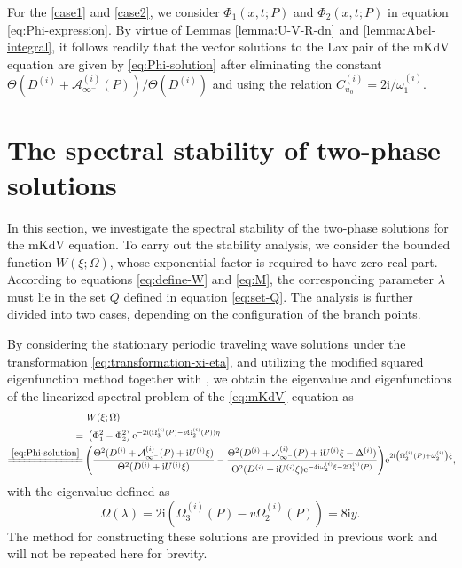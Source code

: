 \documentclass[11pt,reqno]{amsart}
\newcommand{\ii}{\mathrm{i}}
\newcommand{\ee}{\mathrm{e}}
\numberwithin{equation}{section}
\begin{document}
\newenvironment{proof-solution-dn-Phi}{\emph{\textbf{Proof of \Cref{theorem:solution-Phi}.}}}{\hfill$\Box$\medskip}
\begin{proof-solution-dn-Phi}
	For the \ref{case1} and \ref{case2}, we consider $\Phi_{1}(x,t;P)$ and $\Phi_{2}(x,t;P)$ in equation \eqref{eq:Phi-expression}. By virtue of Lemmas \ref{lemma:U-V-R-dn} and \ref{lemma:Abel-integral}, it follows readily that the vector solutions to the Lax pair of the mKdV equation are given by \eqref{eq:Phi-solution}
	after eliminating the constant $\Theta(D^{(i)}+\mathcal{A}^{(i)}_{\infty^-}(P))/\Theta(D^{(i)})$ and using the relation $C_{u_0}^{(i)}=2\ii/\omega_1^{(i)}$.
\end{proof-solution-dn-Phi}
 


\section{The spectral stability of two-phase solutions }\label{section:spectral-stability}

In this section, we investigate the spectral stability of the two-phase solutions for the mKdV equation.  
To carry out the stability analysis, we consider the bounded function $W(\xi;\Omega)$, whose exponential factor is required to have zero real part. 
According to equations \eqref{eq:define-W} and \eqref{eq:M}, the corresponding parameter $\lambda$ must lie in the set $Q$ defined in equation \eqref{eq:set-Q}.
The analysis is further divided into two cases, depending on the configuration of the branch points.

By considering the stationary periodic traveling wave solutions  under the transformation \eqref{eq:transformation-xi-eta},  and utilizing the modified squared eigenfunction method together with  , we obtain the eigenvalue and eigenfunctions of the linearized spectral problem of the \ref{eq:mKdV} equation as
\begin{equation}\label{eq:define-W}
	\begin{split}
	\!\!	&\ W(\xi;\Omega)\\
	=&\ \left(\Phi_{1}^2-\Phi_{2}^2\right)\ee^{-2\ii (\Omega_3^{(i)}(P)-v\Omega_2^{(i)}(P)) \eta}\\
	\xlongequal{\eqref{eq:Phi-solution}}& \left(\frac{\Theta^2(D^{(i)}+\mathcal{A}_{\infty^{-}}^{(i)}(P)+\ii U^{(i)}\xi)}{\Theta^2(D^{(i)}+\ii U^{(i)}\xi)}-\frac{\Theta^2(D^{(i)}+\mathcal{A}_{\infty^{-}}^{(i)}(P)+\ii U^{(i)}\xi -\Delta^{(i)})}
		{\Theta^2(D^{(i)}+\ii U^{(i)}\xi)\ee^{-4\ii \omega_{2}^{(i)}\xi-2\Omega_1^{(i)}(P)}}\right) \!
		\ee^{2\ii \left(\Omega_2^{(i)}(P) + \omega_2^{(i)} \right)\xi},\!\!
	\end{split}
\end{equation}
with the eigenvalue defined as 
\begin{equation}\label{eq:define-Omega}
		\Omega(\lambda)=2\ii (\Omega_3^{(i)}(P)-v\Omega_2^{(i)}(P))=8\ii y.
\end{equation}
The method for constructing these solutions are provided in previous work \cite{LingS-23-mKdV-stability}
and will not be repeated here for brevity.
\end{document}
